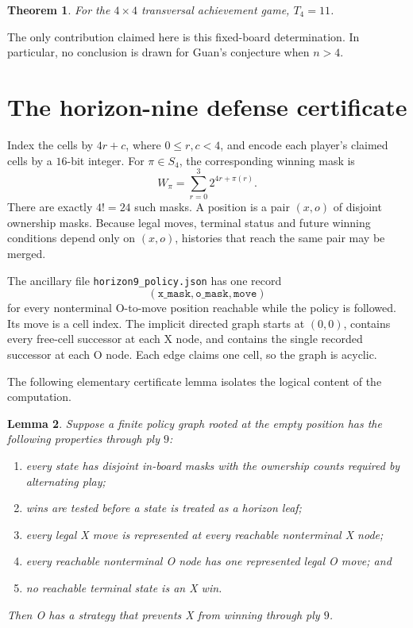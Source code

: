 \documentclass[11pt]{article}
\newtheorem{theorem}{Theorem}
\newtheorem{lemma}[theorem]{Lemma}
\newcommand{\Tfour}{T_4}
\begin{document}
\begin{theorem}\label{thm:main}
For the $4\times4$ transversal achievement game, $\Tfour=11$.
\end{theorem}

The only contribution claimed here is this fixed-board determination.  In
particular, no conclusion is drawn for Guan's conjecture when $n>4$.

\section{The horizon-nine defense certificate}

Index the cells by $4r+c$, where $0\leq r,c<4$, and encode each player's
claimed cells by a $16$-bit integer.  For $\pi\in S_4$, the corresponding
winning mask is
\[
 W_\pi=\sum_{r=0}^{3}2^{4r+\pi(r)}.
\]
There are exactly $4!=24$ such masks.  A position is a pair $(x,o)$ of
disjoint ownership masks.  Because legal moves, terminal status and future
winning conditions depend only on $(x,o)$, histories that reach the same pair
may be merged.

The ancillary file \texttt{horizon9\_policy.json} has one record
\[
 (\texttt{x\_mask},\texttt{o\_mask},\texttt{move})
\]
for every nonterminal O-to-move position reachable while the policy is
followed.  Its move is a cell index.  The implicit directed graph starts at
$(0,0)$, contains every free-cell successor at each X node, and contains the
single recorded successor at each O node.  Each edge claims one cell, so the
graph is acyclic.

The following elementary certificate lemma isolates the logical content of
the computation.

\begin{lemma}\label{lem:certificate}
Suppose a finite policy graph rooted at the empty position has the following
properties through ply $9$:
\begin{enumerate}
 \item every state has disjoint in-board masks with the ownership counts
 required by alternating play;
 \item wins are tested before a state is treated as a horizon leaf;
 \item every legal X move is represented at every reachable nonterminal X
 node;
 \item every reachable nonterminal O node has one represented legal O move;
 and
 \item no reachable terminal state is an X win.
\end{enumerate}
Then O has a strategy that prevents X from winning through ply $9$.
\end{lemma}
\end{document}
